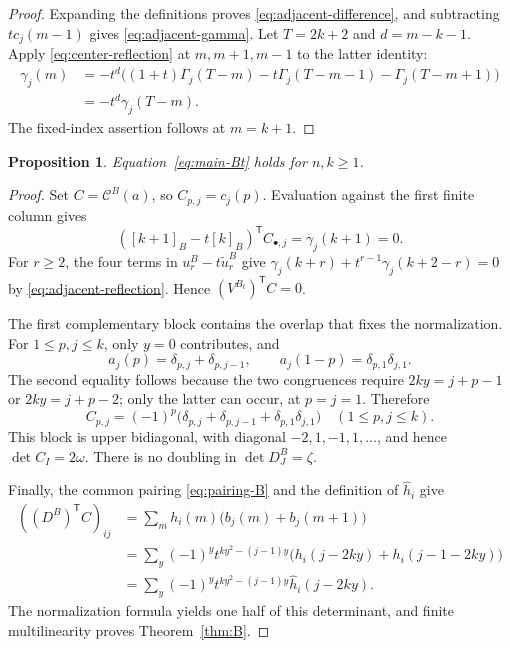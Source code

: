 \documentclass[12pt]{article}
\newtheorem{proposition}[theorem]{Proposition}
\numberwithin{equation}{section}
\begin{document}
\begin{proof}
Expanding the definitions proves \eqref{eq:adjacent-difference}, and
subtracting $tc_j(m-1)$ gives \eqref{eq:adjacent-gamma}.
Let $T=2k+2$ and $d=m-k-1$.  Apply
\eqref{eq:center-reflection} at $m,m+1,m-1$ to the latter identity:
\begin{align*}
 \gamma_j(m)
 &=-t^d\bigl((1+t)\Gamma_j(T-m)
             -t\Gamma_j(T-m-1)-\Gamma_j(T-m+1)\bigr)\\
 &=-t^d\gamma_j(T-m).
\end{align*}
The fixed-index assertion follows at $m=k+1$.
\end{proof}

\begin{proposition}
Equation~\eqref{eq:main-Bt} holds for $n,k\ge1$.
\end{proposition}

\begin{proof}
Set $C=\mathcal C^B(a)$, so $C_{p,j}=c_j(p)$.
Evaluation against the first finite column gives
\[
 ([k+1]_B-t[k]_B)^{\mathsf T}C_{\bullet,j}
 =\gamma_j(k+1)=0.
\]
For $r\ge2$, the four terms in $u_r^B-t\widetilde u_r^B$ give
$\gamma_j(k+r)+t^{r-1}\gamma_j(k+2-r)=0$ by
\eqref{eq:adjacent-reflection}.  Hence
$(V^{B_t})^{\mathsf T}C=0$.

The first complementary block contains the overlap that fixes the
normalization.  For $1\le p,j\le k$, only $y=0$ contributes, and
\[
 a_j(p)=\delta_{p,j}+\delta_{p,j-1},\qquad
 a_j(1-p)=\delta_{p,1}\delta_{j,1}.
\]
The second equality follows because the two congruences require
$2ky=j+p-1$ or $2ky=j+p-2$; only the latter can occur, at $p=j=1$.
Therefore
\[
 C_{p,j}=(-1)^p\bigl(\delta_{p,j}+\delta_{p,j-1}
                         +\delta_{p,1}\delta_{j,1}\bigr)
 \quad(1\le p,j\le k).
\]
This block is upper bidiagonal, with diagonal $-2,1,-1,1,\ldots$,
and hence $\det C_I=2\omega$.  There is no doubling in
$\det D^B_J=\zeta$.

Finally, the common pairing \eqref{eq:pairing-B} and the definition of
$\widehat h_i$ give
\begin{align*}
 ((D^B)^{\mathsf T}C)_{ij}
 &=\sum_m h_i(m)\bigl(b_j(m)+b_j(m+1)\bigr)\\
 &=\sum_y(-1)^yt^{ky^2-(j-1)y}
          \bigl(h_i(j-2ky)+h_i(j-1-2ky)\bigr)\\
 &=\sum_y(-1)^yt^{ky^2-(j-1)y}\widehat h_i(j-2ky).
\end{align*}
The normalization formula yields one half of this determinant, and
finite multilinearity proves Theorem~\ref{thm:B}.
\end{proof}
\end{document}
